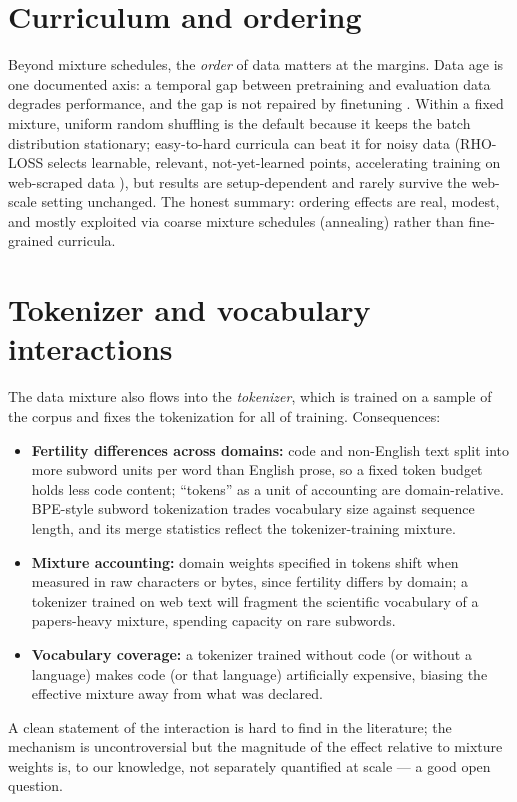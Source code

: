 \documentclass[11pt]{article}
\begin{document}
\section{Curriculum and ordering}
Beyond mixture schedules, the \emph{order} of data matters at the margins. Data age is one documented axis: a temporal gap between pretraining and evaluation data degrades performance, and the gap is not repaired by finetuning \cite{longpre2023pretrainer}. Within a fixed mixture, uniform random shuffling is the default because it keeps the batch distribution stationary; easy-to-hard curricula can beat it for noisy data (RHO-LOSS selects learnable, relevant, not-yet-learned points, accelerating training on web-scraped data \cite{mindermann2022prioritized}), but results are setup-dependent and rarely survive the web-scale setting unchanged. The honest summary: ordering effects are real, modest, and mostly exploited via coarse mixture schedules (annealing) rather than fine-grained curricula.

\section{Tokenizer and vocabulary interactions}
The data mixture also flows into the \emph{tokenizer}, which is trained on a sample of the corpus and fixes the tokenization for all of training. Consequences:
\begin{itemize}[noitemsep]
  \item \textbf{Fertility differences across domains:} code and non-English text split into more subword units per word than English prose, so a fixed token budget holds less code content; ``tokens'' as a unit of accounting are domain-relative. BPE-style subword tokenization \cite{sennrich2016neural} trades vocabulary size against sequence length, and its merge statistics reflect the tokenizer-training mixture.
  \item \textbf{Mixture accounting:} domain weights specified in tokens shift when measured in raw characters or bytes, since fertility differs by domain; a tokenizer trained on web text will fragment the scientific vocabulary of a papers-heavy mixture, spending capacity on rare subwords.
  \item \textbf{Vocabulary coverage:} a tokenizer trained without code (or without a language) makes code (or that language) artificially expensive, biasing the effective mixture away from what was declared.
\end{itemize}
A clean statement of the interaction is hard to find in the literature; the mechanism is uncontroversial but the magnitude of the effect relative to mixture weights is, to our knowledge, not separately quantified at scale --- a good open question.
\end{document}
